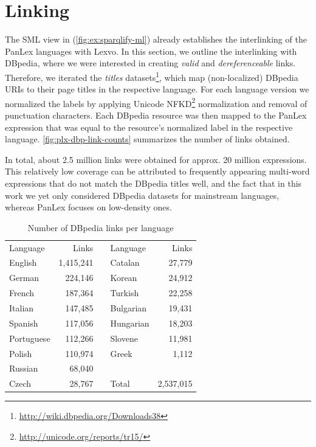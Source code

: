 \documentclass[sw]{iosart2c}
\begin{document}
\section{Linking}
\label{sec:linking}
The SML view in (\autoref{fig:ex:sparqlify-ml}) already establishes the interlinking of the PanLex languages with Lexvo.
In this section, we outline the interlinking with DBpedia, where we were interested in creating \emph{valid} and \emph{dereferenceable} links.
Therefore, we iterated the \emph{titles} datasets\footnote{\url{http://wiki.dbpedia.org/Downloads38}}, which map (non-localized) DBpedia URIs to their page titles in the respective language.
For each language version we normalized the labels by applying Unicode NFKD\footnote{\url{http://unicode.org/reports/tr15/}} normalization and removal of punctuation characters.
Each DBpedia resource was then mapped to the PanLex expression that was equal to the resource's normalized label in the respective language.
\autoref{fig:plx-dbp-link-counts} summarizes the number of links obtained.

In total, about 2.5 million links were obtained for approx. 20 million expressions.
This relatively low coverage can be attributed to frequently appearing multi-word expressions that do not match the DBpedia titles well, and the fact that in this work we yet only considered DBpedia datasets for mainstream languages, whereas PanLex focuses on low-density ones.

\begin{table}
  \centering\begin{scriptsize}

  \begin{tabular}{lrclr}
    Language   &   Links   && Language  & Links     \\
    \cline{1-2}\cline{4-5}
    English    & 1,415,241 && Catalan   &    27,779 \\
    German     &   224,146 && Korean    &    24,912 \\
    French     &   187,364 && Turkish   &    22,258 \\
    Italian    &   147,485 && Bulgarian &    19,431 \\
    Spanish    &   117,056 && Hungarian &    18,203 \\
    Portuguese &   112,266 && Slovene   &    11,981 \\
    Polish     &   110,974 && Greek     &     1,112 \\
    \cline{4-5}
    Russian    &    68,040 \\
    Czech      &    28,767 && Total     & 2,537,015 \\
  \end{tabular}
  \end{scriptsize}
  \caption{Number of DBpedia links per language}
  \label{fig:plx-dbp-link-counts}
\end{table}
\end{document}

